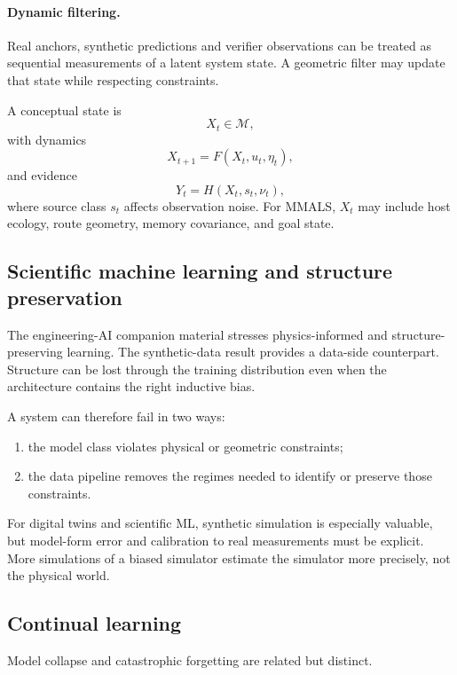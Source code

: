 \paragraph{Dynamic filtering.} Real anchors, synthetic predictions and verifier observations can be treated as sequential measurements of a latent system state. A geometric filter may update that state while respecting constraints.

A conceptual state is
\[
X_t\in\mathcal M,
\]
with dynamics
\[
X_{t+1}=F(X_t,u_t,\eta_t),
\]
and evidence
\[
Y_t=H(X_t,s_t,\nu_t),
\]
where source class $s_t$ affects observation noise. For MMALS, $X_t$ may include host ecology, route geometry, memory covariance, and goal state.

\subsection{Scientific machine learning and structure preservation}

The engineering-AI companion material stresses physics-informed and structure-preserving learning. The synthetic-data result provides a data-side counterpart. Structure can be lost through the training distribution even when the architecture contains the right inductive bias.

A system can therefore fail in two ways:

\begin{enumerate}[leftmargin=*]
  \item the model class violates physical or geometric constraints;
  \item the data pipeline removes the regimes needed to identify or preserve those constraints.
\end{enumerate}

For digital twins and scientific ML, synthetic simulation is especially valuable, but model-form error and calibration to real measurements must be explicit. More simulations of a biased simulator estimate the simulator more precisely, not the physical world.

\subsection{Continual learning}

Model collapse and catastrophic forgetting are related but distinct.

